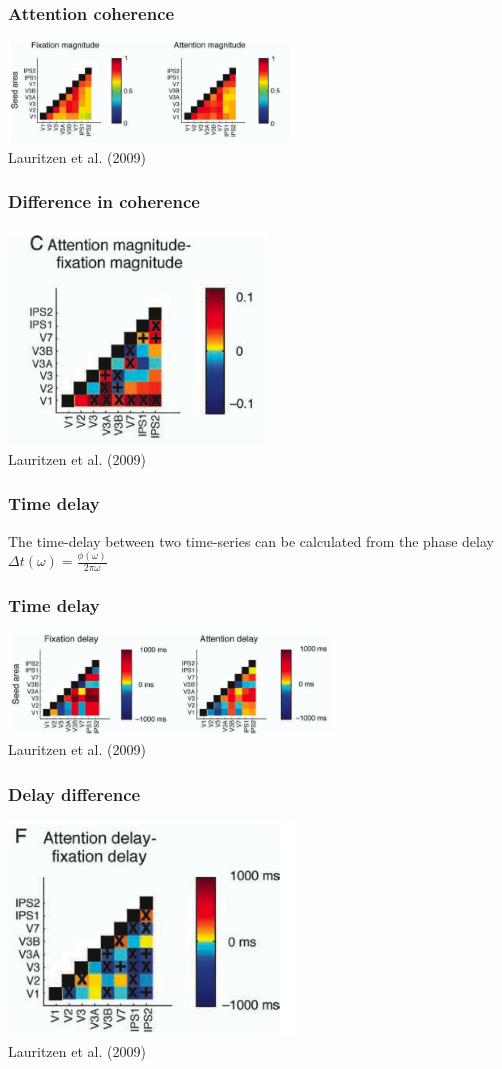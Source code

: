 \documentclass{beamer}
\begin{document}
\begin{frame}
\frametitle{Attention coherence}
\includegraphics[height=2.7cm]{figures/lauritzen4}
\\
\hfill 
Lauritzen et al. (2009)
\end{frame}

\begin{frame}
\frametitle{Difference in coherence}
\includegraphics[height=5.7cm]{figures/lauritzen5}
\\
\hfill 
Lauritzen et al. (2009)
\end{frame}


\begin{frame}
\frametitle{Time delay}
The time-delay between two time-series can be calculated from the phase delay 
\\ 
\pause
\vspace{1cm}
$\Delta t (\omega) = \frac{\phi(\omega)}{2 \pi \omega}$
\end{frame}

\begin{frame}
\frametitle{Time delay}
\includegraphics[height=2.7cm]{figures/lauritzen6}
\\
\hfill 
Lauritzen et al. (2009)
\end{frame}

\begin{frame}
\frametitle{Delay difference}
\includegraphics[height=5.7cm]{figures/lauritzen7}
\\
\hfill 
Lauritzen et al. (2009)
\end{frame}
\end{document}
